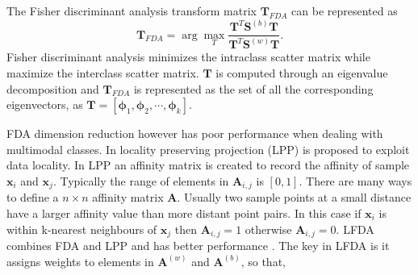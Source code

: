 \documentclass[10pt,twocolumn,letterpaper]{article}
\begin{document}
The Fisher discriminant analysis transform matrix $\bm{T}_{FDA}$ can be represented as 
\begin{equation}
\bm{T}_{FDA} = \arg\max_T \frac{\bm{T}^T\bm{S}^{(b)}\bm{T}}{\bm{T}^T\bm{S}^{(w)}\bm{T}}.
\end{equation}
Fisher discriminant analysis minimizes the intraclass scatter matrix while maximize the interclass scatter matrix. $\bm{T}$ is computed through an eigenvalue decomposition and $\bm{T}_{FDA}$ is represented as the set of all the corresponding eigenvectors, as $ \bm{T} = [\bm{\phi}_1,\bm{\phi}_2,\cdots,\bm{\phi}_k]$.

FDA dimension reduction however has poor performance when dealing with multimodal classes. In \cite{LPP} locality preserving projection (LPP) is proposed to exploit data locality. In LPP an affinity matrix is created to record the affinity of sample $\bm{x}_i$ and $\bm{x}_j$.  Typically the range of elements in $\bm{A}_{i,j}$ is $[0,1]$. There are many ways to define a $n \times n$ affinity matrix $\bm{A}$. Usually two sample points at a small distance have a larger affinity value than more distant point pairs. In this case if  $\bm{x}_i$ is within k-nearest neighbours of $\bm{x}_j$ then $\bm{A}_{i,j} = 1$ otherwise  $\bm{A}_{i,j} = 0$.  LFDA combines FDA and LPP and has better performance \cite{KLFDA}. The key in LFDA is it assigns weights to elements in $\bm{A}^{(w)}$ and $\bm{A}^{(b)}$, so that,

%
%
\end{document}
